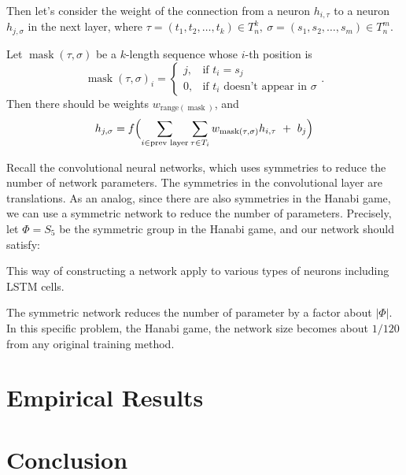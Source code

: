 \documentclass[12pt]{article}
\begin{document}
\begin{spacing}{1.15}
Then let's consider the weight of the connection from a neuron $h_{i,\tau}$ to a neuron $h_{j,\sigma}$ in the next layer, where $\tau = (t_1,t_2,\dots,t_k) \in T_n^k,~\sigma = (s_1,s_2,\dots,s_m) \in T_n^m$.

\newcommand\mask{\mathop{\mathrm{mask}}}
Let $\mask(\tau,\sigma)$ be a $k$-length sequence whose $i$-th position is
\[\mask(\tau,\sigma)_i = \begin{cases}
  j,&\text{if }t_i=s_j \\
  0,&\text{if }t_i\text{ doesn't appear in }\sigma
\end{cases}.\]
Then there should be weights $w_{\mathrm{range}(\mask)}$, and
\[h_{j,\sigma} = f\Bigl(\sum_{i\in\text{prev layer}}\sum_{\tau\in T_i}w_{\mask(\tau,\sigma)}h_{i,\tau}~+~b_j\Bigr)\]

Recall the convolutional neural networks, which uses symmetries to reduce the number of network parameters. The symmetries in the convolutional layer are translations. As an analog, since there are also symmetries in the Hanabi game, we can use a symmetric network to reduce the number of parameters. Precisely, let $\Phi = S_5$ be the symmetric group in the Hanabi game, and our network should satisfy:

This way of constructing a network apply to various types of neurons including LSTM cells.

The symmetric network reduces the number of parameter by a factor about $|\Phi|$. In this specific problem, the Hanabi game, the network size becomes about $1 / 120$ from any original training method.

\section{Empirical Results}

\section{Conclusion}

\normalem


\end{spacing}
\end{document}
